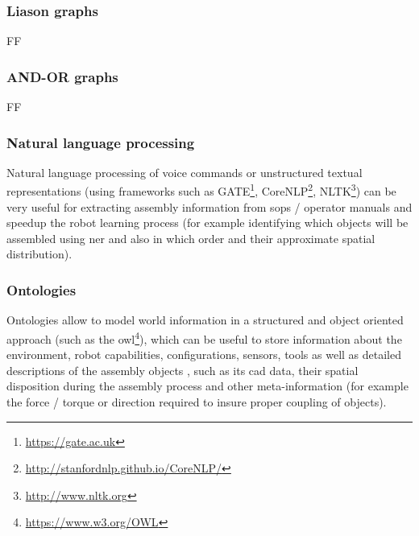 \subsubsection{Liason graphs}

FF


\subsubsection{AND-OR graphs}

FF


\subsubsection{Natural language processing}

Natural language processing \cite{Manning1999,Jurafsky2000,Manning2008} of voice commands or unstructured textual representations (using frameworks such as GATE\footnote{\url{https://gate.ac.uk}}, CoreNLP\footnote{\url{http://stanfordnlp.github.io/CoreNLP/}}, NLTK\footnote{\url{http://www.nltk.org}}) can be very useful for extracting assembly information from \glspl{sop} / operator manuals and speedup the robot learning process \cite{Tenorth2010,Stenmark2013,Stenmark2014,Stenmark2016} (for example identifying which objects will be assembled using \gls{ner} \cite{Ekbal2012,Rami2014} and also in which order and their approximate spatial distribution).



\subsubsection{Ontologies}

Ontologies allow to model world information in a structured and object oriented approach \cite{Lemaignan2012,Stenmark2015} (such as the \gls{owl}\footnote{\url{https://www.w3.org/OWL}}), which can be useful to store information about the environment, robot capabilities, configurations, sensors, tools as well as detailed descriptions of the assembly objects \cite{Perzylo2015}, such as its \gls{cad} data, their spatial disposition during the assembly process and other meta-information (for example the force / torque or direction required to insure proper coupling of objects).

